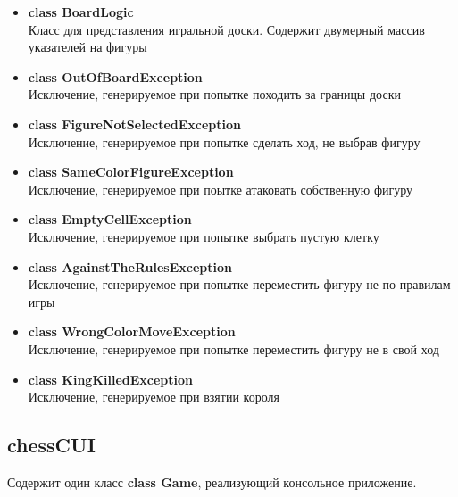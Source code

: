 \begin{itemize}
\item\textbf{class BoardLogic}\\
Класс для представления игральной доски. Содержит двумерный массив указателей на фигуры\\
\item\textbf{class OutOfBoardException}\\
Исключение, генерируемое при попытке походить за границы доски\\
\item\textbf{class FigureNotSelectedException}\\
Исключение, генерируемое при попытке сделать ход, не выбрав фигуру\\
\item\textbf{class SameColorFigureException}\\
Исключение, генерируемое при поытке атаковать собственную фигуру\\
\item\textbf{class EmptyCellException}\\
Исключение, генерируемое при попытке выбрать пустую клетку\\
\item\textbf{class AgainstTheRulesException}\\
Исключение, генерируемое при попытке переместить фигуру не по правилам игры\\
\item\textbf{class WrongColorMoveException}\\
Исключение, генерируемое при попытке переместить фигуру не в свой ход\\
\item\textbf{class KingKilledException}\\
Исключение, генерируемое при взятии короля\\
\end{itemize}

\subsection*{chessCUI}
Содержит один класс \textbf{class Game}, реализующий консольное приложение.\\

